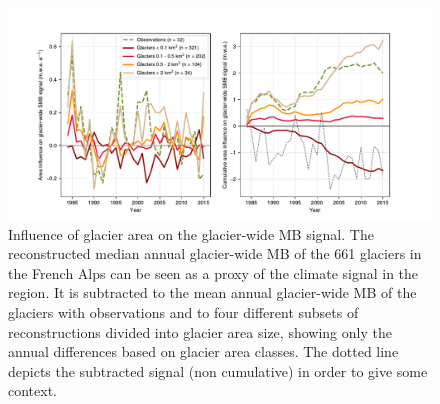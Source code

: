 \begin{figure}[h]
\centering
\includegraphics[width=16cm]{Figures/past/Figure_S3.pdf}
\captionsetup{justification=centering}
\caption{Influence of glacier area on the glacier-wide MB signal. The reconstructed median annual glacier-wide MB of the 661 glaciers in the French Alps can be seen as a proxy of the climate signal in the region. It is subtracted to the mean annual glacier-wide MB of the glaciers with observations and to four different subsets of reconstructions divided into glacier area size, showing only the annual differences based on glacier area classes. The dotted line depicts the subtracted signal (non cumulative) in order to give some context.}
\label{past:figS3}
\end{figure}

